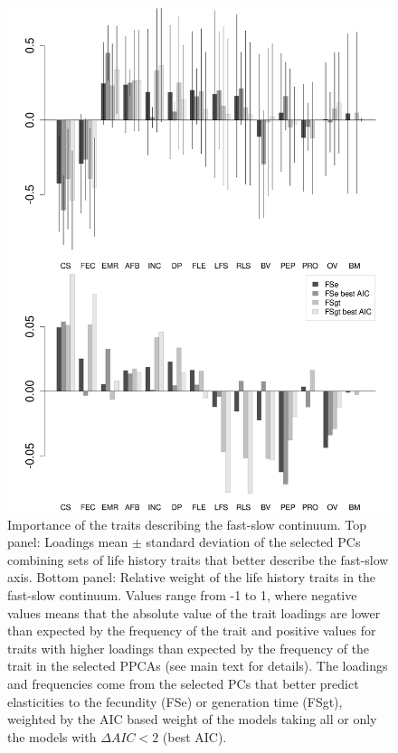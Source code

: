 \begin{figure}
\centering
\includegraphics[width=\textwidth]{./Figures/chapter02/fig2-FSaxes.png}
\caption[Fast-Slow PC loadings]{
Importance of the traits describing the fast-slow continuum. Top panel: Loadings 
mean $\pm$ standard deviation of the selected PCs combining sets of life history
traits that better describe the fast-slow axis. Bottom panel: Relative weight
of the life history traits in the fast-slow continuum. Values range from -1 to
1, where negative values means that the absolute value of the trait loadings are
lower than expected by the frequency of the trait and positive values for traits
with higher loadings than expected by the frequency of the trait in the
selected PPCAs (see main text for details). The loadings and frequencies come
from the selected PCs that better predict elasticities to the fecundity
(FSe) or generation time (FSgt), weighted by the AIC based weight of the models
taking all or only the models with $\Delta AIC < 2$ (best AIC).}
\label{fig:fig2.2}
\end{figure}


